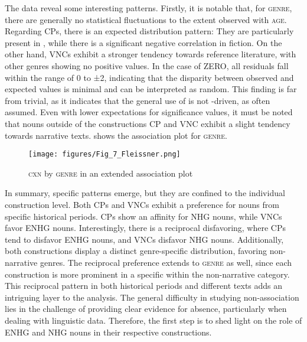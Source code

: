 \documentclass[output=paper,colorlinks,citecolor=brown]{langscibook}
\begin{document}
The data reveal some interesting patterns. Firstly, it is notable that, for \textsc{genre}, there are generally no statistical fluctuations to the extent observed with \textsc{age}. Regarding CPs, there is an expected distribution pattern: They are particularly present in , while there is a significant negative correlation in fiction. On the other hand, VNCs exhibit a stronger tendency towards reference literature, with other genres showing no positive values. In the case of ZERO, all residuals fall within the range of 0 to ±2, indicating that the disparity between observed and expected values is minimal and can be interpreted as random. This finding is far from trivial, as it indicates that the general use of  is not -driven, as often assumed. Even with lower expectations for significance values, it must be noted that nouns outside of the constructions CP and VNC exhibit a slight tendency towards narrative texts.  shows the association plot for \textsc{genre}.

\begin{figure}
     \texttt{[image: figures/Fig\_7\_Fleissner.png]}
     \caption{\textsc{cxn} \textup{by} \textsc{genre} \textup{in an extended association plot}}
     \label{fig:fleissner:5}
 \end{figure}
\newpage
In summary, specific patterns emerge, but they are confined to the individual construction level. Both CPs and VNCs exhibit a preference for nouns from specific historical periods. CPs show an affinity for NHG nouns, while VNCs favor ENHG nouns. Interestingly, there is a reciprocal disfavoring, where CPs tend to disfavor ENHG nouns, and VNCs disfavor NHG nouns. Additionally, both constructions display a distinct genre-specific distribution, favoring non-narrative genres. The reciprocal preference extends to \textsc{genre} as well, since each construction is more prominent in a specific  within the non-narrative category. This reciprocal pattern in both historical periods and different texts adds an intriguing layer to the analysis. The general difficulty in studying non-association lies in the challenge of providing clear evidence for absence, particularly when dealing with linguistic data. Therefore, the first step is to shed light on the role of ENHG and NHG nouns in their respective constructions.
\end{document}
